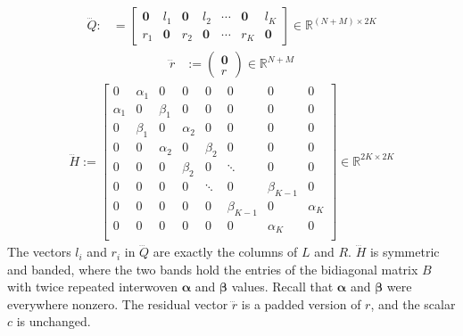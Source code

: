 \documentclass[a4paper,12pt]{article}
\theoremstyle{definition}
\begin{document}
\begin{align}
\dddot{Q} :&= \begin{bmatrix}\mathbf{0} & l_1 & \mathbf{0} & l_2 & \cdots & \mathbf{0} & l_K \\ r_1 & \mathbf{0} & r_2 & \mathbf{0} &  \cdots & r_K & \mathbf{0} \end{bmatrix} \in \mathbb{R}^{(N+M) \times 2K}  \label{eq:Q_sparsity_pattern} 
\end{align}
\begin{align}
\dddot{r} &:=\begin{pmatrix}\mathbf{0} \\ r \end{pmatrix} \in \mathbb{R}^{N+M} \label{eq:r_sparsity_pattern}
\end{align}
\begin{align}
\dddot{H} := \begin{bmatrix}
0 & \alpha_1 & 0  & 0 & 0 & 0 & 0 & 0\\
\alpha_1 & 0  & \beta_1 & 0 & 0 & 0 & 0 & 0\\
0 & \beta_1  & 0 & \alpha_2 & 0 & 0 & 0 & 0\\
0 & 0 & \alpha_2 & 0  & \beta_2 & 0 & 0 & 0\\
0 & 0 & 0 & \beta_2  & 0 & \ddots & 0 & 0\\
0 & 0 & 0 & 0   & \ddots & 0 & \beta_{K-1} & 0\\
0 & 0 & 0 & 0 & 0 & \beta_{K-1}  & 0 & \alpha_K\\
0 & 0 & 0 & 0 & 0 & 0  & \alpha_K & 0\\
\end{bmatrix} \in \mathbb{R}^{2K \times 2K} \label{eq:H_sparsity_pattern}
\end{align}
The vectors $l_i$ and $r_i$ in $\dddot{Q}$ are exactly the columns of $L$ and $R$. $\dddot{H}$ is symmetric and banded, where the two bands hold the entries of the bidiagonal matrix $B$ with twice repeated interwoven $\boldsymbol{\alpha}$ and $\boldsymbol{\beta}$ values. Recall that $\boldsymbol{\alpha}$ and $\boldsymbol{\beta}$ were everywhere nonzero. The residual vector $\dddot{r}$ is a padded version of $r$, and the scalar $c$ is unchanged.
\end{document}
